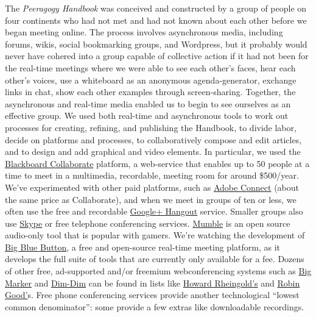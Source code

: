 The \emph{Peeragogy Handbook} was conceived and constructed by a group
of people on four continents who had not met and had not known about
each other before we began meeting online. The process involves
asynchronous media, including forums, wikis, social bookmarking groups,
and Wordpress, but it probably would never have cohered into a group
capable of collective action if it had not been for the real-time
meetings where we were able to see each other's faces, hear each other's
voices, use a whiteboard as an anonymous agenda-generator, exchange
links in chat, show each other examples through screen-sharing.
Together, the asynchronous and real-time media enabled us to begin to
see ourselves as an effective group. We used both real-time and
asynchronous tools to work out processes for creating, refining, and
publishing the Handbook, to divide labor, decide on platforms and
processes, to collaboratively compose and edit articles, and to design
and add graphical and video elements. In particular, we used the
\href{http://www.blackboard.com/platforms/collaborate/overview.aspx}{Blackboard
Collaborate} platform, a web-service that enables up to 50 people at a
time to meet in a multimedia, recordable, meeting room for around
\$500/year. We've experimented with other paid platforms, such as
\href{http://success.adobe.com/en/na/sem/products/connect/1109\_6011\_connect\_webinars.html}{Adobe
Connect} (about the same price as Collaborate), and when we meet in
groups of ten or less, we often use the free and recordable
\href{http://www.google.com/+/learnmore/hangouts/}{Google+ Hangout}
service. Smaller groups also use \href{http://www.skype.com}{Skype} or
free telephone conferencing services.
\href{http://mumble.sourceforge.net/}{Mumble} is an open source
audio-only tool that is popular with gamers. We're watching the
development of \href{http://www.bigbluebutton.org/}{Big Blue Button}, a
free and open-source real-time meeting platform, as it develops the full
suite of tools that are currently only available for a fee. Dozens of
other free, ad-supported and/or freemium webconferencing systems such as
\href{http://www.bigmarker.com/about}{Big Marker} and
\href{http://www.dimdim.com}{Dim-Dim} can be found in lists like
\href{http://delicious.com/hrheingold/webconferencing}{Howard
Rheingold's} and
\href{http://www.mindmeister.com/12213323/best-online-collaboration-tools-2012-robin-good-s-collaborative-map}{Robin
Good'}s. Free phone conferencing services provide another technological
``lowest common denominator'': some provide a few extras like
downloadable recordings.

